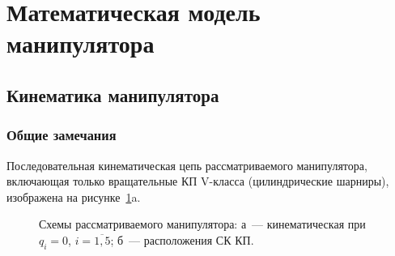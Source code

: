 \section{Математическая модель манипулятора}\label{part_math_model_of_robot}

\subsection{Кинематика манипулятора}\label{part_kinematics}

\subsubsection{Общие замечания}


Последовательная кинематическая цепь рассматриваемого манипулятора, включающая только вращательные КП V-класса (цилиндрические шарниры), изображена на рисунке~\ref{img:kinematics}a.

\begin{figure}[h!]
	\begin{minipage}[h]{0.5\linewidth}
	\end{minipage}
	\hfill
	\begin{minipage}[h]{0.5\linewidth}
	\end{minipage}
	\caption{Схемы рассматриваемого манипулятора: а~--- кинематическая при $q_i=0$, $i=\overline{1,5}$; б~--- расположения СК КП.}
	\label{img:kinematics}
\end{figure}

